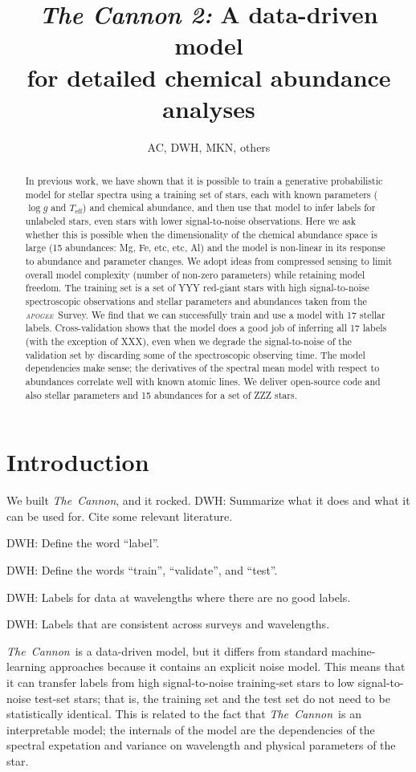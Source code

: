 \documentclass[12pt,preprint]{aastex}
\newcommand{\project}[1]{\textsl{#1}}
\newcommand{\thecannon}{\project{The~Cannon}}
\newcommand{\apogee}{\project{\textsc{apogee}}}
\newcommand{\logg}{\log g}
\newcommand{\Teff}{T_{\mathrm{eff}}}
\begin{document}
\title{\textsl{The Cannon 2:} A data-driven model \\ for detailed chemical abundance analyses}
\author{AC, DWH, MKN, others}

\begin{abstract}
In previous work, we have shown that it is possible to train a generative
probabilistic model for stellar spectra using a training set of stars, each with known
parameters ($\logg$ and $\Teff$) and chemical abundance, and then use that model to infer labels for
unlabeled stars, even stars with lower signal-to-noise observations.
Here we ask whether this is possible when the dimensionality of the chemical
abundance space is large (15 abundances: Mg, Fe, etc, etc, Al)
and the model is non-linear in its response to abundance and parameter changes.
We adopt ideas from compressed sensing to limit overall model complexity (number
of non-zero parameters) while retaining model freedom.
The training set is a set of YYY red-giant stars with high signal-to-noise
spectroscopic observations and stellar parameters and abundances taken from the
\apogee\ Survey.
We find that we can successfully train and use a model with 17 stellar labels.
Cross-validation shows that the model does a good job of inferring all 17 labels
(with the exception of XXX), even when we degrade the signal-to-noise of the
validation set by discarding some of the spectroscopic observing time.
The model dependencies make sense; the derivatives of the spectral mean model
with respect to abundances correlate well with known atomic lines.
We deliver open-source code and also stellar parameters and 15 abundances for a
set of ZZZ stars.
\end{abstract}

\section{Introduction}

We built \thecannon, and it rocked.
DWH: Summarize what it does and what it can be used for.
Cite some relevant literature.

DWH: Define the word ``label''.

DWH: Define the words ``train'', ``validate'', and ``test''.

DWH: Labels for data at wavelengths where there are no good labels.

DWH: Labels that are consistent across surveys and wavelengths.

\thecannon\ is a data-driven model, but it differs from standard machine-learning
approaches because it contains an explicit noise model.
This means that it can transfer labels from high signal-to-noise training-set
stars to low signal-to-noise test-set stars; that is, the training set and 
the test set do not need to be statistically identical.
This is related to the fact that \thecannon\ is an interpretable model;
the internals of the model are the dependencies of the spectral expetation
and variance on wavelength and physical parameters of the star.
\end{document}
